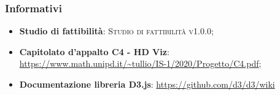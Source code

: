 \documentclass[../analisi-dei-requisiti.tex]{subfiles}
\begin{document}
\subsubsection{Informativi}%
\label{sssec:informativi}
\begin{itemize}
  \item \textbf{Studio di fattibilità}: \textsc{Studio di fattibilità v1.0.0};
  \item \textbf{Capitolato d'appalto C4 - HD Viz}: \url{https://www.math.unipd.it/~tullio/IS-1/2020/Progetto/C4.pdf};
  \item \textbf{Documentazione libreria D3.js}: \url{https://github.com/d3/d3/wiki}
\end{itemize}
\end{document}
